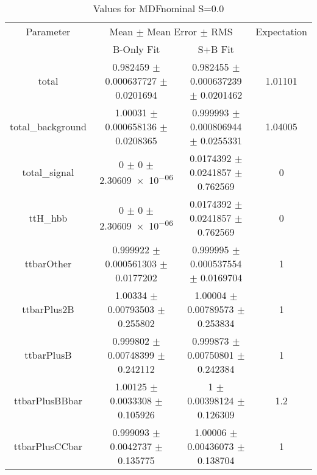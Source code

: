 \begin{table}
\centering
\caption{Values for MDFnominal S=0.0}
\begin{tabular}{cccc}
\toprule
Parameter & \multicolumn{2}{c}{Mean $\pm$ Mean Error $\pm$ RMS} & Expectation\\
 & B-Only Fit & S+B Fit & \\
\midrule
total & \num{0.982459} $\pm$ \num{0.000637727} $\pm$ \num{0.0201694} & \num{0.982455} $\pm$ \num{0.000637239} $\pm$ \num{0.0201462} & \num{1.01101}\\
total\_background & \num{1.00031} $\pm$ \num{0.000658136} $\pm$ \num{0.0208365} & \num{0.999993} $\pm$ \num{0.000806944} $\pm$ \num{0.0255331} & \num{1.04005}\\
total\_signal & \num{0} $\pm$ \num{0} $\pm$ \num{2.30609e-06} & \num{0.0174392} $\pm$ \num{0.0241857} $\pm$ \num{0.762569} & \num{0}\\
ttH\_hbb & \num{0} $\pm$ \num{0} $\pm$ \num{2.30609e-06} & \num{0.0174392} $\pm$ \num{0.0241857} $\pm$ \num{0.762569} & \num{0}\\
ttbarOther & \num{0.999922} $\pm$ \num{0.000561303} $\pm$ \num{0.0177202} & \num{0.999995} $\pm$ \num{0.000537554} $\pm$ \num{0.0169704} & \num{1}\\
ttbarPlus2B & \num{1.00334} $\pm$ \num{0.00793503} $\pm$ \num{0.255802} & \num{1.00004} $\pm$ \num{0.00789573} $\pm$ \num{0.253834} & \num{1}\\
ttbarPlusB & \num{0.999802} $\pm$ \num{0.00748399} $\pm$ \num{0.242112} & \num{0.999873} $\pm$ \num{0.00750801} $\pm$ \num{0.242384} & \num{1}\\
ttbarPlusBBbar & \num{1.00125} $\pm$ \num{0.0033308} $\pm$ \num{0.105926} & \num{1} $\pm$ \num{0.00398124} $\pm$ \num{0.126309} & \num{1.2}\\
ttbarPlusCCbar & \num{0.999093} $\pm$ \num{0.0042737} $\pm$ \num{0.135775} & \num{1.00006} $\pm$ \num{0.00436073} $\pm$ \num{0.138704} & \num{1}\\
\bottomrule
\end{tabular}
\end{table}